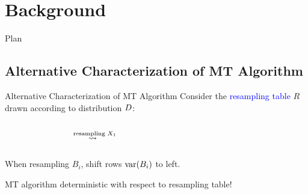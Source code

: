 \documentclass{beamer}
\def\padding{\vspace{0.5cm}}
\def\spadding{\vspace{0.25cm}}
\def\b{\textcolor{blue}}
\begin{document}
\section{Background}
\begin{frame}{Plan}
\tableofcontents[currentsection, sectionstyle=show/shaded, hideothersubsections]
\end{frame}

\subsection{Alternative Characterization of MT Algorithm}
\begin{frame}{Alternative Characterization of MT Algorithm}
Consider the \b{resampling table} $R$ drawn according to distribution $D$:\spadding

\begin{columns}
\begin{column}{.25\textwidth}
\vspace{0.15em}\pause
\end{column}\pause
\begin{column}{.1\textwidth}
\centering $\overset{\text{resampling $X_1$}}{\rightsquigarrow\hspace{0.5em}}$
\end{column}
\begin{column}{.3\textwidth}

\end{column}
\begin{column}{.05\textwidth}
\end{column}
\end{columns}\pause

When resampling $B_i$, shift rows $\mathrm{var}(B_i)$ to left.\pause\padding

\follows MT algorithm deterministic with respect to resampling table!
\end{frame}

    
    
\end{document}
